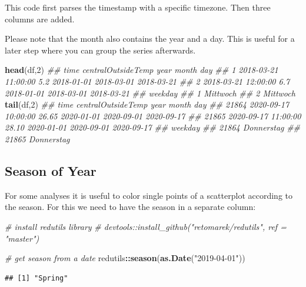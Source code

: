 \documentclass[
]{book}
\newenvironment{Shaded}{\begin{snugshade}}{\end{snugshade}}
\newcommand{\CommentTok}[1]{\textcolor[rgb]{0.56,0.35,0.01}{\textit{#1}}}
\newcommand{\DecValTok}[1]{\textcolor[rgb]{0.00,0.00,0.81}{#1}}
\newcommand{\KeywordTok}[1]{\textcolor[rgb]{0.13,0.29,0.53}{\textbf{#1}}}
\newcommand{\NormalTok}[1]{#1}
\newcommand{\OperatorTok}[1]{\textcolor[rgb]{0.81,0.36,0.00}{\textbf{#1}}}
\newcommand{\StringTok}[1]{\textcolor[rgb]{0.31,0.60,0.02}{#1}}
\begin{document}
This code first parses the timestamp with a specific timezone. Then three columns are added.

Please note that the month also contains the year and a day. This is useful for a later step where you can group the series afterwards.

\begin{Shaded}
\begin{Highlighting}[]
\KeywordTok{head}\NormalTok{(df,}\DecValTok{2}\NormalTok{)}
\CommentTok{##                  time centralOutsideTemp       year      month        day}
\CommentTok{## 1 2018-03-21 11:00:00                5.2 2018-01-01 2018-03-01 2018-03-21}
\CommentTok{## 2 2018-03-21 12:00:00                6.7 2018-01-01 2018-03-01 2018-03-21}
\CommentTok{##    weekday}
\CommentTok{## 1 Mittwoch}
\CommentTok{## 2 Mittwoch}
\KeywordTok{tail}\NormalTok{(df,}\DecValTok{2}\NormalTok{)}
\CommentTok{##                      time centralOutsideTemp       year      month        day}
\CommentTok{## 21864 2020-09-17 10:00:00              26.65 2020-01-01 2020-09-01 2020-09-17}
\CommentTok{## 21865 2020-09-17 11:00:00              28.10 2020-01-01 2020-09-01 2020-09-17}
\CommentTok{##          weekday}
\CommentTok{## 21864 Donnerstag}
\CommentTok{## 21865 Donnerstag}
\end{Highlighting}
\end{Shaded}

\hypertarget{season-of-year}{%
\subsection{Season of Year}\label{season-of-year}}

For some analyses it is useful to color single points of a scatterplot according to the season. For this we need to have the season in a separate column:

\begin{Shaded}
\begin{Highlighting}[]
\CommentTok{# install redutils library}
\CommentTok{# devtools::install_github("retomarek/redutils", ref = "master")}

\CommentTok{# get season from a date}
\NormalTok{redutils}\OperatorTok{::}\KeywordTok{season}\NormalTok{(}\KeywordTok{as.Date}\NormalTok{(}\StringTok{"2019-04-01"}\NormalTok{))}
\end{Highlighting}
\end{Shaded}

\begin{verbatim}
## [1] "Spring"
\end{verbatim}
\end{document}
